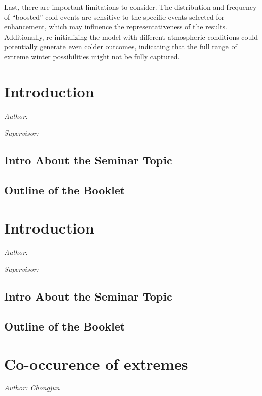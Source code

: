\documentclass[
]{krantz}
\begin{document}
Last, there are important limitations to consider. The distribution and frequency of ``boosted'' cold events are sensitive to the specific events selected for enhancement, which may influence the representativeness of the results. Additionally, re-initializing the model with different atmospheric conditions could potentially generate even colder outcomes, indicating that the full range of extreme winter possibilities might not be fully captured.

\chapter{Introduction}\label{introduction-2}

\emph{Author: }

\emph{Supervisor: }

\section{Intro About the Seminar Topic}\label{intro-about-the-seminar-topic-1}

\section{Outline of the Booklet}\label{outline-of-the-booklet-1}

\chapter{Introduction}\label{introduction-3}

\emph{Author: }

\emph{Supervisor: }

\section{Intro About the Seminar Topic}\label{intro-about-the-seminar-topic-2}

\section{Outline of the Booklet}\label{outline-of-the-booklet-2}

\chapter{Co-occurence of extremes}\label{co-occurence-of-extremes}

\emph{Author: Chongjun }
\end{document}
